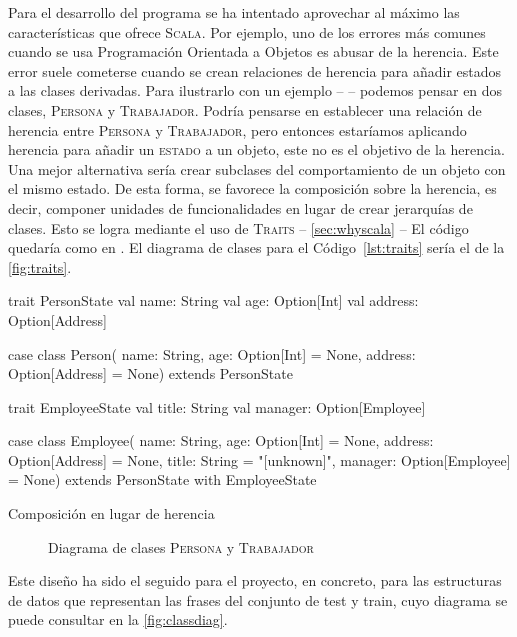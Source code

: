 Para el desarrollo del programa se ha intentado aprovechar al máximo las
características que ofrece \textsc{Scala}. Por ejemplo, uno de los errores más
comunes cuando se usa Programación Orientada a Objetos es abusar de la
herencia. Este error suele cometerse cuando se crean relaciones de herencia para
añadir estados a las clases derivadas. Para ilustrarlo con un ejemplo --
\citet{Dean2015} -- podemos pensar en dos clases, \textsc{Persona} y
\textsc{Trabajador}. Podría pensarse en establecer una relación de herencia
entre \textsc{Persona} y \textsc{Trabajador}, pero entonces estaríamos aplicando
herencia para añadir un \textsc{estado} a un objeto, este no es el objetivo de
la herencia. Una mejor alternativa sería crear subclases del comportamiento de
un objeto con el mismo estado. De esta forma, se favorece la composición sobre
la herencia, es decir, componer unidades de funcionalidades en lugar de crear
jerarquías de clases. Esto se logra mediante el uso de \textsc{Traits} --
\autoref{sec:whyscala} -- El código quedaría como en . El
diagrama de clases para el Código~\ref{lst:traits} sería el de la
\autoref{fig:traits}.
\begin{listing}[H]
  \begin{scalacode}
    trait PersonState {
      val name: String
      val age: Option[Int]
      val address: Option[Address]
    }

    case class Person(
      name: String,
      age: Option[Int] = None,
      address: Option[Address] = None) extends PersonState

    trait EmployeeState {
      val title: String
      val manager: Option[Employee]
    }

    case class Employee(
      name: String,
      age: Option[Int] = None,        
      address: Option[Address] = None,
      title: String = "[unknown]",
      manager: Option[Employee] = None)
    extends PersonState with EmployeeState
  \end{scalacode}
  \caption{Composición en lugar de herencia}
  \label{lst:traits}
\end{listing}
\begin{figure}[ht]
  \centering
  \caption{Diagrama de clases \textsc{Persona} y \textsc{Trabajador}}
  \label{fig:traits}
\end{figure}
Este diseño ha sido el seguido para el proyecto, en concreto, para las
estructuras de datos que representan las frases del conjunto de test y train,
cuyo diagrama se puede consultar en la \autoref{fig:classdiag}.

